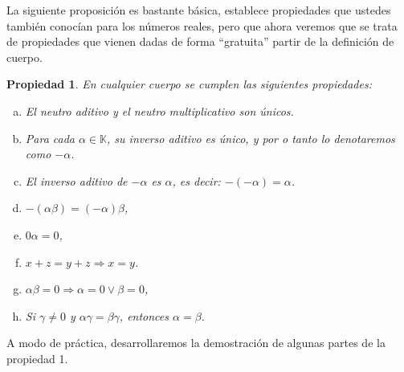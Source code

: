 \documentclass[12pt]{book}
\newtheorem{prop}{Propiedad}
\def\K{\mathbb{K}}
\begin{document}
La siguiente proposici\'on es bastante básica, establece propiedades que ustedes también conocían para los números reales, pero que ahora veremos que se trata de propiedades que vienen dadas de forma ``gratuita'' partir de la definici\'on de cuerpo.

\begin{prop}
En cualquier cuerpo se cumplen las siguientes propiedades:

\begin{enumerate}[a)]
\item\label{u+x} El neutro aditivo y el neutro multiplicativo son únicos. 
\item Para cada $\alpha\in\K$, su inverso aditivo es único, y por o tanto lo denotaremos como $-\alpha$.
\item\label{--x} El inverso aditivo de $-\alpha$ es $\alpha$, es decir: $-(-\alpha)=\alpha$.
\item $-(\alpha\beta)=(-\alpha)\beta$,
\item\label{0x} $0\alpha=0$,
\item $x+z=y+z\Rightarrow x=y$.
\item $\alpha\beta=0\Rightarrow \alpha=0\vee\beta=0$, 
\item Si $\gamma\not =0$ y  $\alpha\gamma=\beta\gamma$, entonces $\alpha=\beta$.
\end{enumerate}
\end{prop}

A modo de pr\'actica, desarrollaremos la demostraci\'on de algunas partes de la propiedad 1.\\
\end{document}
